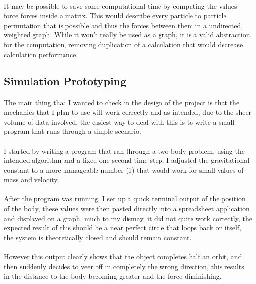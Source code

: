 \paragraph{}
It may be possible to save some computational time by computing the values force forces inside a matrix. This would describe every particle to particle permutation that is possible and thus the forces between them in a undirected, weighted graph. While it won't really be used as a graph, it is a valid abstraction for the computation, removing duplication of a calculation that would decrease calculation performance.

\subsection{Simulation Prototyping}
\paragraph{}
The main thing that I wanted to check in the design of the project is that the mechanics that I plan to use will work correctly and as intended, due to the sheer volume of data involved, the easiest way to deal with this is to write a small program that runs through a simple scenario.

\paragraph{}
I started by writing a program that ran through a two body problem, using the intended algorithm and a fixed one second time step, I adjusted the gravitational constant to a more manageable number (1) that would work for small values of mass and velocity.

\paragraph{}
After the program was running, I set up a quick terminal output of the position of the body, these values were then pasted directly into a spreadsheet application and displayed on a graph, much to my dismay, it did not quite work correctly, the expected result of this should be a near perfect circle that loops back on itself, the system is theoretically closed and should remain constant.

\paragraph{}
However this output clearly shows that the object completes half an orbit, and then suddenly decides to veer off in completely the wrong direction, this results in the distance to the body becoming greater and the force diminishing.

